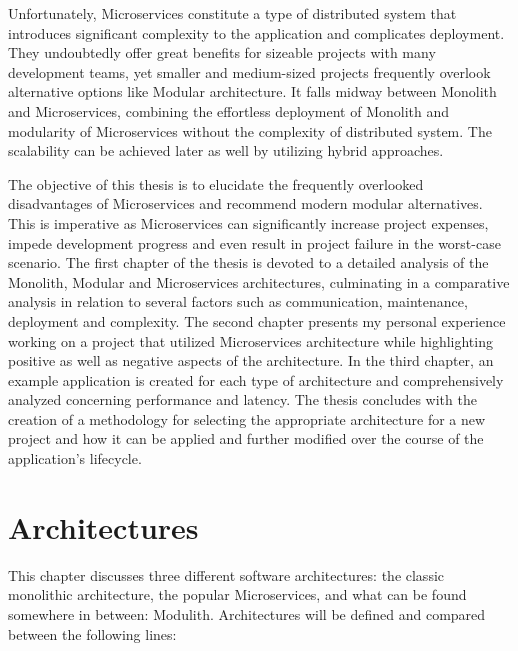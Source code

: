 Unfortunately, Microservices constitute a type of distributed system that introduces significant complexity to the application and complicates deployment. They undoubtedly offer great benefits for sizeable projects with many development teams, yet smaller and medium-sized projects frequently overlook alternative options like Modular architecture. It falls midway between Monolith and Microservices, combining the effortless deployment of Monolith and modularity of Microservices without the complexity of distributed system. The scalability can be achieved later as well by utilizing hybrid approaches.

The objective of this thesis is to elucidate the frequently overlooked disadvantages of Microservices and recommend modern modular alternatives. This is imperative as Microservices can significantly increase project expenses, impede development progress and even result in project failure in the worst-case scenario. The first chapter of the thesis is devoted to a detailed analysis of the Monolith, Modular and Microservices architectures, culminating in a comparative analysis in relation to several factors such as communication, maintenance, deployment and complexity. The second chapter presents my personal experience working on a project that utilized Microservices architecture while highlighting positive as well as negative aspects of the architecture. In the third chapter, an example application is created for each type of architecture and comprehensively analyzed concerning performance and latency.  The thesis concludes with the creation of a methodology for selecting the appropriate architecture for a new project and how it can be applied and further modified over the course of the application's lifecycle.






\chapter{Architectures}
\label{chapter:architectures}
This chapter discusses three different software architectures: the classic monolithic architecture, the popular Microservices, and what can be found somewhere in between: Modulith. Architectures will be defined and compared between the following lines:

